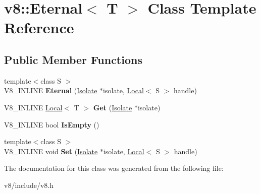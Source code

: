 \hypertarget{classv8_1_1Eternal}{\section{v8\-:\-:Eternal$<$ T $>$ Class Template Reference}
\label{classv8_1_1Eternal}
}
\subsection*{Public Member Functions}
\begin{DoxyCompactItemize}
\item 
\hypertarget{classv8_1_1Eternal_ad7522d8b51e072dcbc4261bc1f155bcb}{{\footnotesize template$<$class S $>$ }\\V8\-\_\-\-I\-N\-L\-I\-N\-E {\bfseries Eternal} (\hyperlink{classv8_1_1Isolate}{Isolate} $\ast$isolate, \hyperlink{classv8_1_1Local}{Local}$<$ S $>$ handle)}\label{classv8_1_1Eternal_ad7522d8b51e072dcbc4261bc1f155bcb}

\item 
\hypertarget{classv8_1_1Eternal_ae9614309d9c93fe484d81926e31ed6b7}{V8\-\_\-\-I\-N\-L\-I\-N\-E \hyperlink{classv8_1_1Local}{Local}$<$ T $>$ {\bfseries Get} (\hyperlink{classv8_1_1Isolate}{Isolate} $\ast$isolate)}\label{classv8_1_1Eternal_ae9614309d9c93fe484d81926e31ed6b7}

\item 
\hypertarget{classv8_1_1Eternal_a5d77cbfe0662af5fe75172be9a8f1d5d}{V8\-\_\-\-I\-N\-L\-I\-N\-E bool {\bfseries Is\-Empty} ()}\label{classv8_1_1Eternal_a5d77cbfe0662af5fe75172be9a8f1d5d}

\item 
\hypertarget{classv8_1_1Eternal_a2f9dcec02b2c2f7d4b55aee0d8b9881a}{{\footnotesize template$<$class S $>$ }\\V8\-\_\-\-I\-N\-L\-I\-N\-E void {\bfseries Set} (\hyperlink{classv8_1_1Isolate}{Isolate} $\ast$isolate, \hyperlink{classv8_1_1Local}{Local}$<$ S $>$ handle)}\label{classv8_1_1Eternal_a2f9dcec02b2c2f7d4b55aee0d8b9881a}

\end{DoxyCompactItemize}


The documentation for this class was generated from the following file\-:\begin{DoxyCompactItemize}
\item 
v8/include/v8.\-h\end{DoxyCompactItemize}
